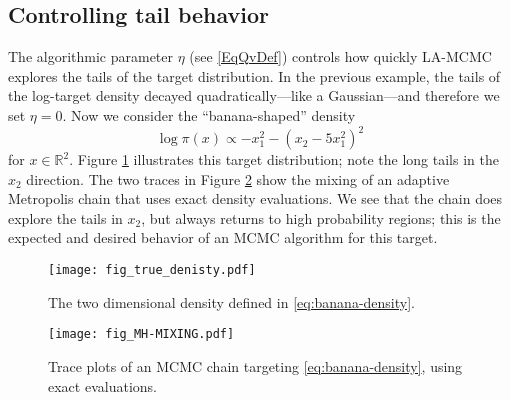 \subsection{Controlling tail behavior} \label{sec:example-banana}

The algorithmic parameter $\eta$ (see \eqref{EqQvDef}) controls how quickly LA-MCMC explores the tails of the target distribution. In the previous example, the tails  of the log-target density decayed quadratically---like a Gaussian---and therefore we set $\eta=0$. Now we consider the ``banana-shaped'' density
\begin{equation}
    \log{\pi(x)} \propto -x_1^2 - (x_2-5x_1^2)^2 
    \label{eq:banana-density}
\end{equation}
for $x \in \mathbb{R}^2$. Figure \ref{fig:banana-density-exact}  illustrates this target distribution; note the long tails in the $x_2$ direction. The two traces in Figure \ref{fig:banana-density-exact-mixing} show the mixing of an adaptive Metropolis \citep{Haarioetal2001} chain that uses exact density evaluations. We see that the chain does explore the tails in $x_2$, but always returns to high probability regions; this is the expected and desired behavior of an MCMC algorithm for this target.

\begin{figure}
\centering
  \texttt{[image: fig\_true\_denisty.pdf]} \\[\abovecaptionskip]
  \caption{The two dimensional density defined in \eqref{eq:banana-density}.}
  \label{fig:banana-density-exact}
\end{figure}

\begin{figure}
\centering
  \texttt{[image: fig\_MH-MIXING.pdf]} \\[\abovecaptionskip]
  \caption{Trace plots of an MCMC chain targeting \eqref{eq:banana-density}, using exact evaluations.}
  \label{fig:banana-density-exact-mixing}
\end{figure}

